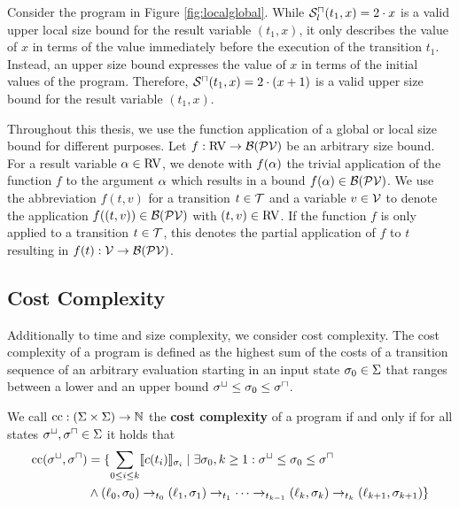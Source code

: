 \begin{example}
  
  Consider the program in Figure \ref{fig:localglobal}.
  While ${\mathcal{S}^\sqcap_l}(t_1, x) = 2 \cdot x$ is a valid upper local size bound for the result variable $(t_1, x)$, it only describes the value of $x$ in terms of the value immediately before the execution of the transition $t_1$.
  Instead, an upper size bound expresses the value of $x$ in terms of the initial values of the program.
  Therefore, ${\mathcal{S}^\sqcap}(t_1, x) = 2 \cdot (x + 1)$ is a valid upper size bound for the result variable $(t_1, x)$.
\end{example}

Throughout this thesis, we use the function application of a global or local size bound for different purposes.
Let $f: \text{RV} \rightarrow \mathcal{B}(\mathcal{PV})$ be an arbitrary size bound.
For a result variable $\alpha \in \text{RV}$, we denote with $f(\alpha)$ the trivial application of the function $f$ to the argument $\alpha$ which results in a bound $f(\alpha) \in \mathcal{B}(\mathcal{PV})$.
We use the abbreviation $f(t, v)$ for a transition $t \in \mathcal{T}$ and a variable $v \in \mathcal{V}$ to denote the application $f((t,v)) \in \mathcal{B}(\mathcal{PV})$ with $(t,v) \in \text{RV}$.
If the function $f$ is only applied to a transition $t \in \mathcal{T}$, this denotes the partial application of $f$ to $t$ resulting in $f(t): \mathcal{V} \rightarrow \mathcal{B}(\mathcal{PV})$.

\subsection{Cost Complexity}

Additionally to time and size complexity, we consider cost complexity.
The cost complexity of a program is defined as the highest sum of the costs of a transition sequence of an arbitrary evaluation starting in an input state $\sigma_0 \in \Sigma$ that ranges between a lower and an upper bound ${\sigma^\sqcup} \leq \sigma_0 \leq {\sigma^\sqcap}$.

\begin{definition}
  We call $\text{cc}: (\Sigma \times \Sigma) \rightarrow \mathbb{N}$ the \textbf{cost complexity} of a program if and only if for all states ${\sigma^\sqcup}, {\sigma^\sqcap} \in \Sigma$ it holds that
  \begin{align*}
    \text{cc}({\sigma^\sqcup}, {\sigma^\sqcap}) &=
    \lbrace  \sum_{0 \leq i \leq k} \llbracket c(t_i) \rrbracket_{\sigma_i} \mid \exists \sigma_0, k \geq 1: {\sigma^\sqcup} \leq \sigma_0 \leq {\sigma^\sqcap} \\
      &\wedge (\ell_0, \sigma_0) \rightarrow_{t_0} (\ell_1, \sigma_1) \rightarrow_{t_1} \dots \rightarrow_{t_{k-1}} (\ell_k, \sigma_k) \rightarrow_{t_k} (\ell_{k+1}, \sigma_{k+1})  \rbrace
  \end{align*}
\end{definition}


